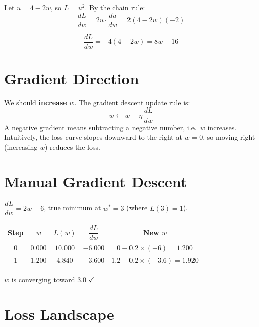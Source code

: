 \documentclass[11pt, a4paper]{article}
\begin{document}
\begin{tcolorbox}[solutionbox]
Let $u = 4 - 2w$, so $L = u^2$. By the chain rule:
$$\frac{dL}{dw} = 2u \cdot \frac{du}{dw} = 2(4 - 2w)(-2)$$
\begin{tcolorbox}[answerbox]
$$\frac{dL}{dw} = -4(4 - 2w) = 8w - 16$$
\end{tcolorbox}
\end{tcolorbox}

\section{Gradient Direction}

\begin{tcolorbox}[solutionbox]
We should \textbf{increase} $w$. The gradient descent update rule is:
$$w \leftarrow w - \eta\,\frac{dL}{dw}$$
A negative gradient means subtracting a negative number, i.e.\ $w$ increases.
Intuitively, the loss curve slopes downward to the right at $w=0$, so moving
right (increasing $w$) reduces the loss.
\end{tcolorbox}

\section{Manual Gradient Descent}

\begin{tcolorbox}[solutionbox]
$\dfrac{dL}{dw} = 2w - 6$, true minimum at $w^* = 3$ (where $L(3) = 1$).

\begin{center}
\begin{tabular}{ccccc}
\toprule
Step & $w$ & $L(w)$ & $\dfrac{dL}{dw}$ & New $w$ \\
\midrule
0 & $0.000$ & $10.000$ & $-6.000$ & $0 - 0.2 \times (-6) = 1.200$ \\[0.8em]
1 & $1.200$ & $4.840$  & $-3.600$ & $1.2 - 0.2 \times (-3.6) = 1.920$ \\[0.8em]
\bottomrule
\end{tabular}
\end{center}

$w$ is converging toward $3.0$ $\checkmark$
\end{tcolorbox}

\section{Loss Landscape}
\end{document}
